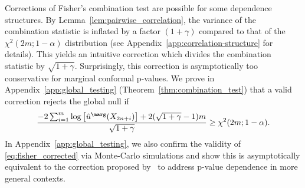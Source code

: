 Corrections of Fisher's combination test are possible for some dependence structures.
By Lemma~\ref{lem:pairwise_correlation}, the variance of the combination statistic is inflated by a factor $(1 + \gamma)$ compared to that of the $\chi^2(2m; 1 - \alpha)$ distribution (see Appendix~\ref{app:correlation-structure} for details). This yields an intuitive correction which divides the combination statistic by $\sqrt{1 + \gamma}$. Surprisingly, this correction is asymptotically too conservative for marginal conformal p-values.
We prove in Appendix~\ref{app:global_testing} (Theorem~\ref{thm:combination_test}) that a valid correction rejects the global null if
\begin{equation}\label{eq:fisher_corrected}
\frac{-2 \sum_{i=1}^{m} \log \left[\hat{u}^\marg(X_{2n+i})\right] + 2(\sqrt{1 + \gamma} - 1)m}{\sqrt{1 + \gamma}}\ge \chi^2(2m; 1 - \alpha).
\end{equation}
In Appendix~\ref{app:global_testing}, we also confirm the validity of \eqref{eq:fisher_corrected} via Monte-Carlo simulations and show this is asymptotically equivalent to the correction proposed by~\cite{brown1975400, kost2002combining} to address p-value dependence in more general contexts.



